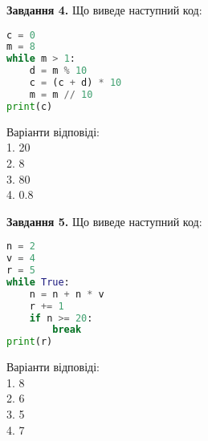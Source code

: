 \documentclass{article}
\begin{document}
\begin{multicols}{2}
\begin{tcolorbox}
\textbf{Завдання 4.} Що виведе наступний код:
\begin{lstlisting}[language=Python]
c = 0
m = 8
while m > 1:
    d = m % 10
    c = (c + d) * 10
    m = m // 10
print(c)
\end{lstlisting}
Варіанти відповіді: \\
1. 20 \\
2. 8 \\
3. 80 \\
4. 0.8 \\
\end{tcolorbox}

\begin{tcolorbox}
\textbf{Завдання 5.} Що виведе наступний код:
\begin{lstlisting}[language=Python]
n = 2
v = 4
r = 5
while True:
    n = n + n * v
    r += 1
    if n >= 20:
        break
print(r)
\end{lstlisting}
Варіанти відповіді: \\
1. 8 \\
2. 6 \\
3. 5 \\
4. 7 \\
\end{tcolorbox}
\end{multicols}
\end{document}
